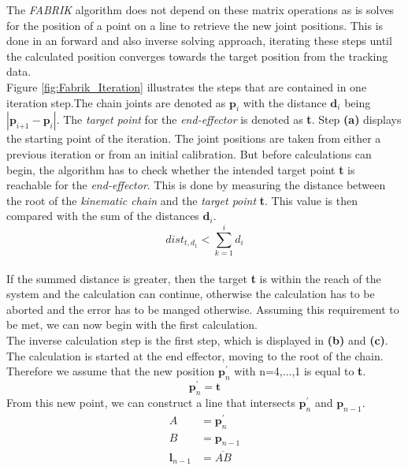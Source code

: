 The \textit{FABRIK} algorithm does not depend on these matrix operations as is solves for the position of a point on a line to retrieve the new joint positions. This is done in an forward and also inverse solving approach, iterating these steps until the calculated position converges towards the target position from the tracking data.
\\Figure \ref{fig:Fabrik_Iteration} illustrates the steps that are contained in one iteration step.The chain joints are denoted as $\textbf{p}_{\textit{i}}$ with the distance $\textbf{d}_{i}$ being $|\textbf{p}_{\textit{i+1}}-\textbf{p}_{\textit{i}}|$. The \textit{target point} for the \textit{end-effector} is denoted as \textbf{t}.
Step \textbf{(a)} displays the starting point of the iteration. The joint positions are taken from either a previous iteration or from an initial calibration. 
But before calculations can begin, the algorithm has to check whether the intended target point \textbf{t} is reachable for the \textit{end-effector}. This is done by measuring the distance between the root of the \textit{kinematic chain} and the \textit{target point} \textbf{t}. This value is then compared with the sum of the distances $\textbf{d}_{i}$.\\
\begin{equation}
 dist_{t,d_{1}}< \sum_{k=1}^{i}{d_{i}}
\end{equation}
\\If the summed distance is greater, then the target \textbf{t} is within the reach of the system and the calculation can continue, otherwise the calculation has to be aborted and the error has to be manged otherwise.
Assuming this requirement to be met, we can now begin with the first calculation. \\The inverse calculation step is the first step, which is displayed in \textbf{(b)} and \textbf{(c)}. The calculation is started at the end effector, moving to the root of the chain.\newpage
Therefore we assume that the new position $\textbf{p}_{n}^{'}$ with n=4,...,1 is equal to \textbf{t}.\\
\begin{equation}
 \textbf{p}_{n}^{'}=\textbf{t}
\end{equation}
From this new point, we can construct a line that intersects $\textbf{p}_{n}^{'}$ and $\textbf{p}_{n-1}$.\\
\begin{equation}
\begin{split}
A&=\textbf{p}_{n}^{'}\\
B&=\textbf{p}_{n-1}\\
\textbf{l}_{n-1}&=\overline{AB}\\
\end{split}
\end{equation}
